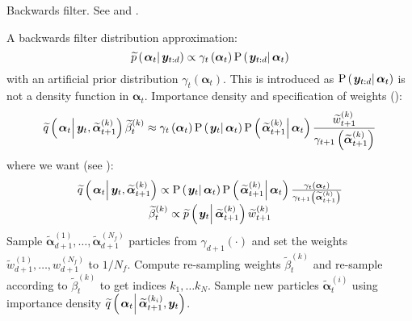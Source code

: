 \documentclass[9pt, notitlepage]{article}
\renewcommand{\vec}[1]{\bm{#1}}
\newcommand{\Lparen}[1]{\left( #1\right)}
\newcommand{\Cond}[2]{\left. #1 \vphantom{#2} \right\vert  #2}
\newcommand{\Prob}{\text{P}}
\newcommand{\optor}[2]{#1\Lparen{#2}}
\newcommand{\optorC}[3]{\optor{#1}{\Cond{#2}{#3}}}
\newcommand{\propC}[2]{\optorC{\Prob}{#1}{#2}}
\newcommand{\propAproxC}[2]{\optorC{\widetilde{p}}{#1}{#2}}
\newcommand{\IDAproxC}[2]{\optorC{\widetilde{q}}{#1}{#2}}
\newcommand{\partic}[3]{#1_{#2}^{\Lparen{#3}}}
\newcommand{\particB}[3]{\widetilde{#1}_{#2}^{\Lparen{#3}}}
\newcommand{\nPart}{N}
\newcommand{\nPeriods}{d}
\begin{document}
\begin{algorithm}[H]
\caption{Backwards filter. See \cite{briers10} and \cite{fearnhead10}.}\label{alg:backward}
\begin{algorithmic}[1]\raggedright
\INPUT
\Statex A backwards filter distribution approximation:
\begin{equation}
	\propAproxC{\vec{\alpha}_t}{\vec{y}_{t:\nPeriods}} \propto \gamma_t \Lparen{\vec{\alpha}_t}\propC{\vec{y}_{t:\nPeriods}}{\vec{\alpha}_t}
\end{equation}
\Statex with an  artificial prior distribution $\gamma_t \Lparen{\vec{\alpha}_t}$. This is introduced as $\propC{\vec{y}_{t:\nPeriods}}{\vec{\alpha}_t}$ is not a density function in $\vec{\alpha}_t$.
\Statex Importance density and specification of weights {\footnotesize (\citet[page 451 -- look in the example in the appendix]{fearnhead10})}:
\Statex\begin{equation}
	\IDAproxC{\vec{\alpha}_t}{\vec{y}_t, \particB{\vec{\alpha}}{t + 1}{k}}\particB{\beta}{t}{k} \approx %
		\gamma_t\Lparen{\vec{\alpha}_t}
		\propC{\vec{y}_t}{\vec{\alpha}_t}
		\propC{\particB{\vec{\alpha}}{t + 1}{k}}{\vec{\alpha}_t}
		\frac{\particB{w}{t + 1}{k}}{\gamma_{t + 1}\Lparen{\particB{\vec{\alpha}}{t + 1}{k}}}
\end{equation}
\Statex where we want {\footnotesize (see \citet[page 74]{briers10})}:
\Statex\begin{equation}\begin{matrix}
	\IDAproxC{\vec{\alpha}_t}{\vec{y}_t, \particB{\vec{\alpha}}{t + 1}{k}} \propto %
		\propC{\vec{y}_t}{\vec{\alpha}_t}
		\propC{\particB{\vec{\alpha}}{t + 1}{k}}{\vec{\alpha}_t}
		\frac{\gamma_t\Lparen{\vec{\alpha}_t}}{\gamma_{t + 1}\Lparen{\particB{\vec{\alpha}}{t + 1}{k}}} \\
	\particB{\beta}{t}{k} \propto %
		 \propAproxC{\vec{y}_t}{\particB{\vec{\alpha}}{t + 1}{k}}\particB{w}{t + 1}{k}
\end{matrix}\end{equation}
%
\State Sample $\particB{\vec{\alpha}}{\nPeriods+1}{1},\dots,\particB{\vec{\alpha}}{\nPeriods+1}{\nPart_f}$ particles from $\gamma_{\nPeriods+1}(\cdot)$ and set the weights $\particB{w}{\nPeriods + 1}{1},\dots,\partic{w}{\nPeriods+1}{\nPart_f}$ to $1 / \nPart_f$.
%
\For{$t=\nPeriods,\dots, 1$}
\State Compute re-sampling weights $\particB{\beta}{t}{k}$ and re-sample according to $\particB{\beta}{t}{k}$ to get indices $k_1,\dots k_\nPart$.
\EndProcedure
%
\State Sample new particles $\particB{\vec{\alpha}}{t}{i}$ using importance density $\IDAproxC{\vec{\alpha}_t}{\particB{\vec{\alpha}}{t + 1}{k_i}, \vec{y}_t}$.

\end{algorithmic}
\end{algorithm}
\end{document}
